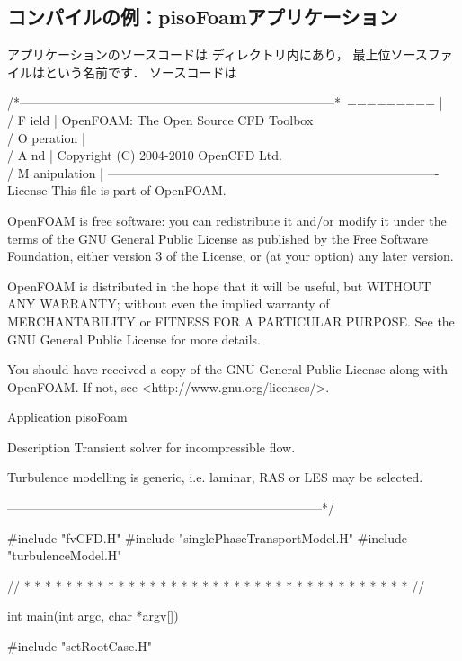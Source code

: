 \subsection{コンパイルの例：pisoFoamアプリケーション}
\label{ssec:3.2.4}
アプリケーションのソースコードは
ディレクトリ内にあり，
最上位ソースファイルはという名前です．
ソースコードは
\begin{OFverbatim}
/*---------------------------------------------------------------------------*\
  =========                 |
  \\      /  F ield         | OpenFOAM: The Open Source CFD Toolbox
   \\    /   O peration     |
    \\  /    A nd           | Copyright (C) 2004-2010 OpenCFD Ltd.
     \\/     M anipulation  |
-------------------------------------------------------------------------------
License
    This file is part of OpenFOAM.

    OpenFOAM is free software: you can redistribute it and/or modify it
    under the terms of the GNU General Public License as published by
    the Free Software Foundation, either version 3 of the License, or
    (at your option) any later version.

    OpenFOAM is distributed in the hope that it will be useful, but WITHOUT
    ANY WARRANTY; without even the implied warranty of MERCHANTABILITY or
    FITNESS FOR A PARTICULAR PURPOSE.  See the GNU General Public License
    for more details.

    You should have received a copy of the GNU General Public License
    along with OpenFOAM.  If not, see <http://www.gnu.org/licenses/>.

Application
    pisoFoam

Description
    Transient solver for incompressible flow.

    Turbulence modelling is generic, i.e. laminar, RAS or LES may be selected.

\*---------------------------------------------------------------------------*/

#include "fvCFD.H"
#include "singlePhaseTransportModel.H"
#include "turbulenceModel.H"

// * * * * * * * * * * * * * * * * * * * * * * * * * * * * * * * * * * * * * //

int main(int argc, char *argv[])
{
    #include "setRootCase.H"

}
\end{OFverbatim}
